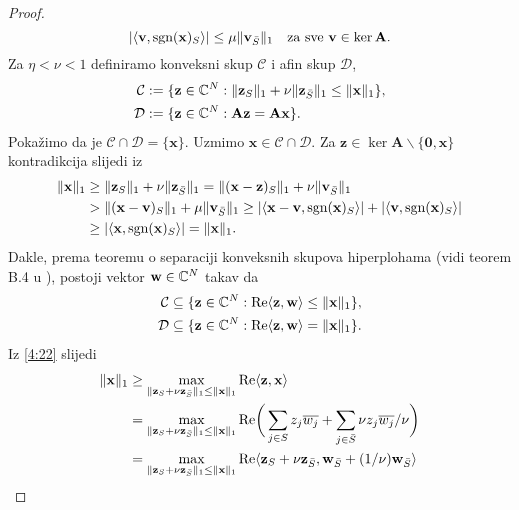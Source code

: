 \documentclass[a4paper,twoside,12pt]{memoir} %
\newcommand{\vect}[1]{\mathbf{#1}}
\renewcommand{\vec}{\vect}
\newcommand{\norm}[1]{\|{#1}\|}
\newcommand{\sgn}{\text{\normalfont{sgn}}}
\renewcommand{\Re}{\text{\normalfont{Re}}}
\begin{document}
\begin{proof}
\begin{equation*}
        |\langle \vec v, \sgn(\vec x)_S \rangle|  \leq \mu\norm{\vec v_{\bar S}}_1 \quad \text{za sve } \vec v \in \ker \vec A.
    \end{equation*}
    Za $\eta < \nu < 1$ definiramo konveksni skup $\mathcal{C}$ i afin skup $\mathcal{D}$,
    \begin{align*}
        \mathcal{C} &:= \{ \vec z \in \C^N : \norm{\vec z_S}_1 + \nu \norm{\vec z_{\bar S}}_1 \leq \norm{\vec x}_1 \},\\
        \mathcal{D} &:= \{ \vec z \in \C^N : \vec{Az} = \vec{Ax} \}.
    \end{align*}
    Poka\v{z}imo da je $\mathcal{C} \cap \mathcal{D} = \{\vec x\}$. Uzmimo $\vec x \in \mathcal{C} \cap \mathcal{D}$. Za $ \vec z \in \ker \vec A \backslash \{\vec 0, \vec x  \}$ kontradikcija slijedi iz
    \begin{align*}
        \norm{\vec x}_1 &\geq \norm{\vec z_S}_1 + \nu \norm{\vec z_{\bar S}}_1 = \norm{(\vec x - \vec z)_S}_1 + \nu \norm{\vec v_{\bar S}}_1\\
        &> \norm{(\vec x - \vec v)_S}_1 + \mu \norm{\vec v_{\bar S}}_1 \geq |\langle \vec x - \vec v, \sgn(\vec x)_S \rangle| + |\langle \vec v, \sgn(\vec x)_S \rangle|\\
        &\geq |\langle \vec x, \sgn(\vec x)_S \rangle| = \norm{\vec x}_1.
    \end{align*}
    Dakle, prema teoremu o separaciji konveksnih skupova hiperplohama (vidi teorem B.4 u \cite{foucart13}), postoji vektor $\vec w \in \C^N$ takav da
    \begin{align}
        \mathcal{C} \subseteq \{ \vec z \in \C^N: \Re \langle \vec z, \vec w \rangle \leq \norm{\vec x}_1 \}\label{4:22},\\
        \mathcal{D} \subseteq \{ \vec z \in \C^N: \Re \langle \vec z, \vec w \rangle = \norm{\vec x}_1 \}\label{4:23}.
    \end{align}
    Iz \eqref{4:22} slijedi
    \begin{align*}
        \norm{\vec x}_1 &\geq \max_{\norm{\vec z_S + \nu \vec z_{\bar S}}_1 \leq \norm{\vec x}_1} \Re \langle \vec z, \vec x\rangle \\
        &=\max_{\norm{\vec z_S + \nu \vec z_{\bar S}}_1 \leq \norm{\vec x}_1} \Re \bigg( \sum_{j \in S} z_j \overline{w_j} + \sum_{j \in \bar S} \nu z_j \overline{w_j}/ \nu \bigg)\\
        &= \max_{\norm{\vec z_S + \nu \vec z_{\bar S}}_1 \leq \norm{\vec x}_1} \Re \langle \vec z_S + \nu \vec z_{\bar S}, \vec w_{\bar S} + (1/\nu) \vec w_{\bar S} \rangle \\

\end{align*}
\end{proof}
\end{document}
